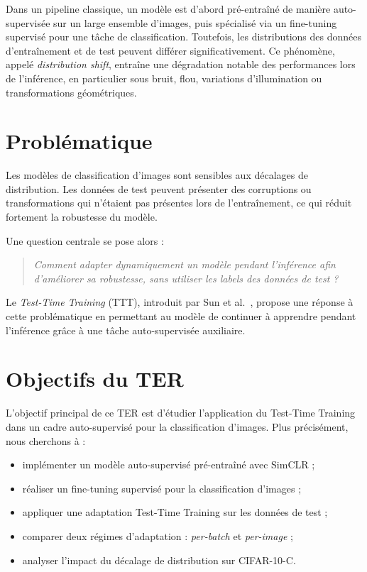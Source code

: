 \documentclass[12pt,a4paper]{report}
\begin{document}
	Dans un pipeline classique, un modèle est d’abord pré-entraîné de manière auto-supervisée sur un large ensemble d’images, puis spécialisé via un fine-tuning supervisé pour une tâche de classification. Toutefois, les distributions des données d’entraînement et de test peuvent différer significativement. Ce phénomène, appelé \emph{distribution shift}, entraîne une dégradation notable des performances lors de l’inférence, en particulier sous bruit, flou, variations d’illumination ou transformations géométriques.
	
	\section{Problématique}
	Les modèles de classification d’images sont sensibles aux décalages de distribution. Les données de test peuvent présenter des corruptions ou transformations qui n’étaient pas présentes lors de l’entraînement, ce qui réduit fortement la robustesse du modèle.
	
	Une question centrale se pose alors :
	
	\begin{quote}
		\textit{Comment adapter dynamiquement un modèle pendant l’inférence afin d’améliorer sa robustesse, sans utiliser les labels des données de test ?}
	\end{quote}
	
	Le \emph{Test-Time Training} (TTT), introduit par Sun et al.~\cite{sun2020ttt}, propose une réponse à cette problématique en permettant au modèle de continuer à apprendre pendant l’inférence grâce à une tâche auto-supervisée auxiliaire.
	
	\section{Objectifs du TER}
	L’objectif principal de ce TER est d’étudier l’application du Test-Time Training dans un cadre auto-supervisé pour la classification d’images. Plus précisément, nous cherchons à :
	
	\begin{itemize}
		\item implémenter un modèle auto-supervisé pré-entraîné avec SimCLR ;
		\item réaliser un fine-tuning supervisé pour la classification d’images ;
		\item appliquer une adaptation Test-Time Training sur les données de test ;
		\item comparer deux régimes d’adaptation : \emph{per-batch} et \emph{per-image} ;
		\item analyser l’impact du décalage de distribution sur CIFAR-10-C.
	\end{itemize}
	
\end{document}
